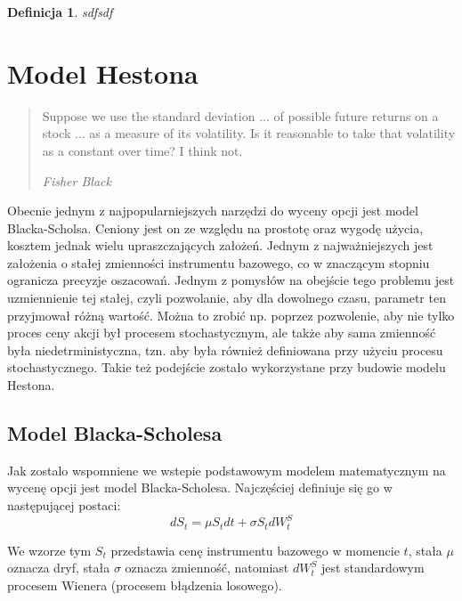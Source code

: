 \documentclass{pracamgr}
\newtheorem{defi}{Definicja}[section]
\begin{document}
\begin{defi}\label{aaa}
sdfsdf
\end{defi}




\chapter{Model Hestona}
\begin{quote}
  Suppose we use the standard deviation ... of possible future returns on
  a stock ... as a measure of its volatility. Is it reasonable to take
  that volatility as a constant over time? I think not.

\raggedleft\slshape Fisher Black 
\end{quote}

Obecnie jednym z najpopularniejszych narzędzi do wyceny opcji jest model Blacka-Scholsa. Ceniony jest on ze względu na prostotę oraz wygodę użycia, kosztem jednak wielu upraszczających założeń. Jednym z najważniejszych jest założenia o stałej zmienności instrumentu bazowego, co w znaczącym stopniu ogranicza precyzje oszacowań. Jednym z pomysłów na obejście tego problemu jest uzmiennienie tej stałej, czyli pozwolanie, aby dla dowolnego czasu, parametr ten przyjmował różną wartość. Można to zrobić np. poprzez pozwolenie, aby nie tylko proces ceny akcji był procesem stochastycznym, ale także aby sama zmienność była niedetrministyczna, tzn. aby była również definiowana przy użyciu procesu stochastycznego. Takie też podejście zostało wykorzystane przy budowie modelu Hestona. \cite{greenwade93}

\section{Model Blacka-Scholesa}

Jak zostalo wspomniene we wstepie podstawowym modelem matematycznym na wycenę opcji jest model Blacka-Scholesa. Najczęściej definiuje się go w następującej postaci:
\begin{equation}
dS_t  = \mu S_t dt + \sigma S_t dW^S_t
\end{equation}

We wzorze tym $S_t$ przedstawia cenę instrumentu bazowego w momencie $t$, stała $\mu$ oznacza dryf, stała $\sigma$ oznacza zmienność, natomiast $dW^S_t$ jest standardowym procesem Wienera (procesem błądzenia losowego).
\end{document}
